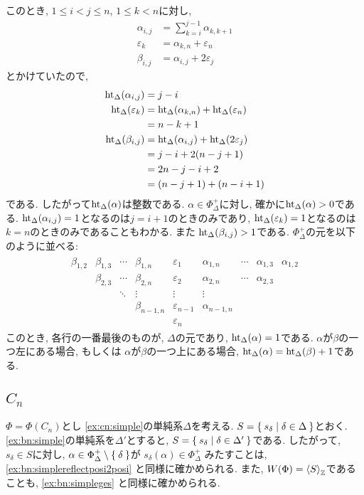 このとき, $1\leq i<j\leq n$, $1\leq k<n$に対し,
\begin{align*}
\alpha_{i,j}&=\sum_{k=i}^{j-1}\alpha_{k,k+1}\\
\varepsilon_{k}&=\alpha_{k,n}+\varepsilon_{n}\\
\beta_{i,j}&=\alpha_{i,j}+2\varepsilon_{j}
\end{align*}
とかけていたので,
\begin{align*}
\operatorname{ht}_\Delta(\alpha_{i,j})&=j-i\\
\operatorname{ht}_\Delta(\varepsilon_{k})&=\operatorname{ht}_\Delta(\alpha_{k,n})+\operatorname{ht}_\Delta(\varepsilon_{n})\\
&=n-k+1\\
\operatorname{ht}_\Delta(\beta_{i,j})&=
\operatorname{ht}_\Delta(\alpha_{i,j})+\operatorname{ht}_\Delta(2\varepsilon_{j})\\
&=j-i+2(n-j+1)\\
&=2n-j-i+2\\
&=(n-j+1)+(n-i+1)
\end{align*}
である.
したがって$\operatorname{ht}_\Delta(\alpha)$は整数である.
$\alpha\in\Phi_\Delta^+$に対し, 確かに$\operatorname{ht}_{\Delta}(\alpha)>0$である.
$\operatorname{ht}_\Delta(\alpha_{i,j})=1$となるのは$j=i+1$のときのみであり,
$\operatorname{ht}_\Delta(\varepsilon_{k})=1$となるのは$k=n$のときのみであることもわかる.
また
$\operatorname{ht}_\Delta(\beta_{i,j})>1$である.
$\Phi_\Delta^+$の元を以下のように並べる:
\begin{align*}
  \begin{array}{ccccccccc}
    \beta_{1,2}&\beta_{1,3}&\cdots&\beta_{1,n}&
    \varepsilon_{1}&\alpha_{1,n}&\cdots&\alpha_{1,3}&\alpha_{1,2}\\
    &\beta_{2,3}&\cdots&\beta_{2,n}&
    \varepsilon_{2}&\alpha_{2,n}&\cdots&\alpha_{2,3}\\
    &&\ddots&\vdots&
    \vdots      &\vdots&&\\
    &&&\beta_{n-1,n}&
    \varepsilon_{n-1}&\alpha_{n-1,n}\\
    &&&&
    \varepsilon_{n}
  \end{array}
\end{align*}
このとき, 各行の一番最後のものが, $\Delta$の元であり,
$\operatorname{ht}_\Delta(\alpha)=1$である.
$\alpha$が$\beta$の一つ左にある場合,
もしくは
$\alpha$が$\beta$の一つ上にある場合,
$\operatorname{ht}_\Delta(\alpha)=\operatorname{ht}_\Delta(\beta)+1$である.





\subsection{$C_{n}$}
$\Phi=\Phi(C_n)$とし
\cref{ex:cn:simple}の単純系$\Delta$を考える.
$S=\Set{s_\delta|\delta\in \Delta}$とおく.
\cref{ex:bn:simple}の単純系を$\Delta'$とすると,
$S=\Set{s_\delta|\delta\in \Delta'}$である.
したがって, 
$s_\delta\in S$に対し,
$\alpha\in\Phi_\Delta^+\setminus\Set{\delta}$が
$s_{\delta}(\alpha)\in\Phi_\Delta^+$
みたすことは, 
\cref{ex:bn:simplereflectposi2posi}
と同様に確かめられる.
また,
$W(\Phi)=\Braket{S}_{\mathbb{Z}}$であることも,
\cref{ex:bn:simpleges}
と同様に確かめられる.

